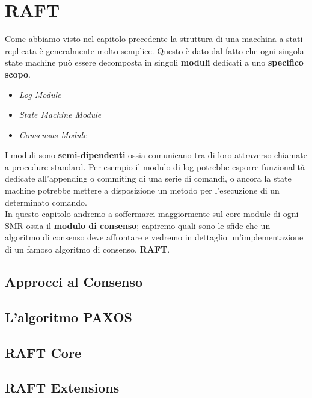 \chapter{RAFT}
	Come abbiamo visto nel capitolo precedente la struttura di una macchina a stati replicata è generalmente molto semplice. Questo è dato dal fatto che ogni singola state machine può essere decomposta in singoli \textbf{moduli} dedicati a uno \textbf{specifico scopo}.
	\begin{itemize}
		\item{\textit{Log Module}}
		\item{\textit{State Machine Module}}
		\item{\textit{Consensus Module}}
	\end{itemize}
	I moduli sono \textbf{semi-dipendenti} ossia comunicano tra di loro attraverso chiamate a procedure standard. Per esempio il modulo di log potrebbe esporre funzionalità dedicate all'appending o commiting di una serie di comandi, o ancora la state machine potrebbe mettere a disposizione un metodo per l'esecuzione di un determinato comando.\\
	In questo capitolo andremo a soffermarci maggiormente sul core-module di ogni SMR ossia il \textbf{modulo di consenso}; capiremo quali sono le sfide che un algoritmo di consenso deve affrontare e vedremo in dettaglio un'implementazione di un famoso algoritmo di consenso, \textbf{RAFT}.

	\section{Approcci al Consenso}
    
  \section{L'algoritmo PAXOS}
    
	\section{RAFT Core}
		
		
		
		
	\section{RAFT Extensions}
		
		
		